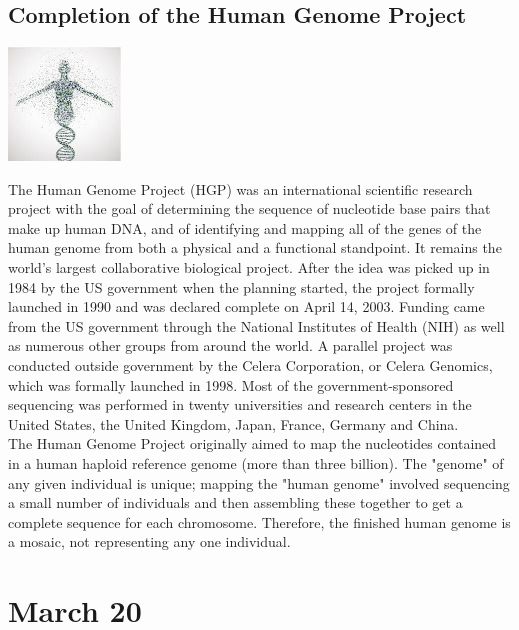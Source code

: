 \documentclass[11pt]{report}
\begin{document}
\subsection{Completion of the Human Genome Project}
\vspace{2mm}\begin{center}\includegraphics[width=3cm]{./img/HGP.jpg}\end{center}
The Human Genome Project (HGP) was an international scientific research project with the goal of determining the sequence of nucleotide base pairs that make up human DNA, and of identifying and mapping all of the genes of the human genome from both a physical and a functional standpoint. It remains the world's largest collaborative biological project. After the idea was picked up in 1984 by the US government when the planning started, the project formally launched in 1990 and was declared complete on April 14, 2003. Funding came from the US government through the National Institutes of Health (NIH) as well as numerous other groups from around the world. A parallel project was conducted outside government by the Celera Corporation, or Celera Genomics, which was formally launched in 1998. Most of the government-sponsored sequencing was performed in twenty universities and research centers in the United States, the United Kingdom, Japan, France, Germany and China.\\
\indent The Human Genome Project originally aimed to map the nucleotides contained in a human haploid reference genome (more than three billion). The "genome" of any given individual is unique; mapping the "human genome" involved sequencing a small number of individuals and then assembling these together to get a complete sequence for each chromosome. Therefore, the finished human genome is a mosaic, not representing any one individual.
\section{March 20}
\end{document}
